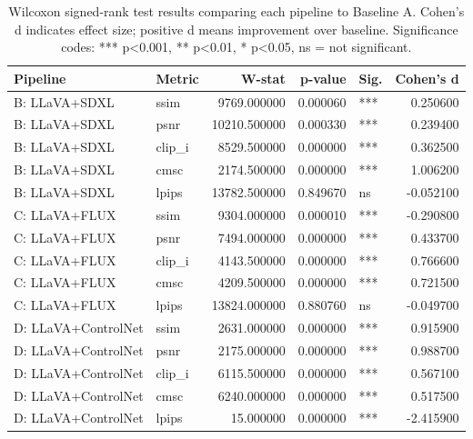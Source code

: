 \begin{table}
\caption{Wilcoxon signed-rank test results comparing each pipeline to Baseline A. Cohen's d indicates effect size; positive d means improvement over baseline. Significance codes: *** p<0.001, ** p<0.01, * p<0.05, ns = not significant.}
\label{tab:significance}
\begin{tabular}{llrrlr}
\toprule
Pipeline & Metric & W-stat & p-value & Sig. & Cohen's d \\
\midrule
B: LLaVA+SDXL & ssim & 9769.000000 & 0.000060 & *** & 0.250600 \\
B: LLaVA+SDXL & psnr & 10210.500000 & 0.000330 & *** & 0.239400 \\
B: LLaVA+SDXL & clip\_i & 8529.500000 & 0.000000 & *** & 0.362500 \\
B: LLaVA+SDXL & cmsc & 2174.500000 & 0.000000 & *** & 1.006200 \\
B: LLaVA+SDXL & lpips & 13782.500000 & 0.849670 & ns & -0.052100 \\
C: LLaVA+FLUX & ssim & 9304.000000 & 0.000010 & *** & -0.290800 \\
C: LLaVA+FLUX & psnr & 7494.000000 & 0.000000 & *** & 0.433700 \\
C: LLaVA+FLUX & clip\_i & 4143.500000 & 0.000000 & *** & 0.766600 \\
C: LLaVA+FLUX & cmsc & 4209.500000 & 0.000000 & *** & 0.721500 \\
C: LLaVA+FLUX & lpips & 13824.000000 & 0.880760 & ns & -0.049700 \\
D: LLaVA+ControlNet & ssim & 2631.000000 & 0.000000 & *** & 0.915900 \\
D: LLaVA+ControlNet & psnr & 2175.000000 & 0.000000 & *** & 0.988700 \\
D: LLaVA+ControlNet & clip\_i & 6115.500000 & 0.000000 & *** & 0.567100 \\
D: LLaVA+ControlNet & cmsc & 6240.000000 & 0.000000 & *** & 0.517500 \\
D: LLaVA+ControlNet & lpips & 15.000000 & 0.000000 & *** & -2.415900 \\
\bottomrule
\end{tabular}
\end{table}
